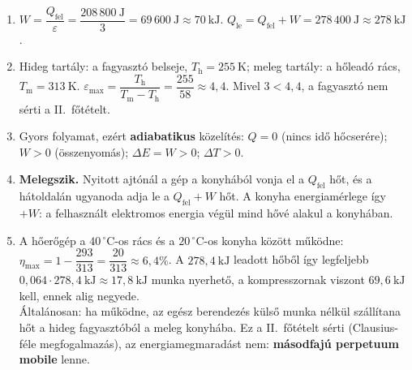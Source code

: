 \documentclass[11pt,a4paper]{article}
\begin{document}
\begin{enumerate}
\begin{enumerate}
\begin{minipage}[t]{0.38\linewidth}
      \end{minipage}
    \item $W = \dfrac{Q_\text{fel}}{\varepsilon} = \dfrac{208\,800~\text{J}}{3} =
      69\,600~\text{J} \approx 70~\text{kJ}$.\quad
      $Q_\text{le} = Q_\text{fel} + W = 278\,400~\text{J} \approx 278~\text{kJ}$.
    \item Hideg tartály: a fagyasztó belseje, $T_\text{h} = 255~\text{K}$; meleg tartály:
      a hőleadó rács, $T_\text{m} = 313~\text{K}$.
      $\varepsilon_\text{max} = \dfrac{T_\text{h}}{T_\text{m} - T_\text{h}} =
      \dfrac{255}{58} \approx 4{,}4$. Mivel $3 < 4{,}4$, a fagyasztó nem sérti a
      II.~főtételt.
    \item Gyors folyamat, ezért \textbf{adiabatikus} közelítés: $Q = 0$ (nincs idő
      hőcserére); $W > 0$ (összenyomás); $\Delta E = W > 0$; $\Delta T > 0$.
    \item \textbf{Melegszik.} Nyitott ajtónál a gép a konyhából vonja el a $Q_\text{fel}$
      hőt, és a hátoldalán ugyanoda adja le a $Q_\text{fel} + W$ hőt. A konyha
      energiamérlege így $+W$: a felhasznált elektromos energia végül mind hővé alakul a
      konyhában.
    \item A hőerőgép a $40\,^\circ$C-os rács és a $20\,^\circ$C-os konyha között működne:
      $\eta_\text{max} = 1 - \dfrac{293}{313} = \dfrac{20}{313} \approx 6{,}4\%$.
      A $278{,}4~\text{kJ}$ leadott hőből így legfeljebb
      $0{,}064\cdot 278{,}4~\text{kJ} \approx 17{,}8~\text{kJ}$ munka nyerhető, a
      kompresszornak viszont $69{,}6~\text{kJ}$ kell, ennek alig negyede.\\
      Általánosan: ha működne, az egész berendezés külső munka nélkül szállítana hőt a
      hideg fagyasztóból a meleg konyhába. Ez a II.~főtételt sérti (Clausius-féle
      megfogalmazás), az energiamegmaradást nem: \textbf{másodfajú perpetuum mobile}
      lenne.
  \end{enumerate}
\end{enumerate}
\end{document}
